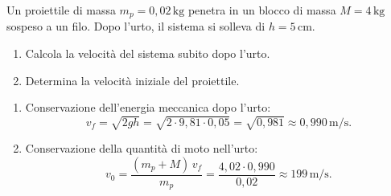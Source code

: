 
\begin{question}[ID=5.2, subtitle={Velocità del proiettile dal pendolo balistico}, tags={pendolo balistico, energia, urto anelastico}, difficulty=media]
Un proiettile di massa \(m_p = 0{,}02 \, \text{kg}\) penetra in un blocco di massa \(M = 4 \, \text{kg}\) sospeso a un filo. Dopo l'urto, il sistema si solleva di \(h = 5 \, \text{cm}\).
\begin{enumerate}
    \item Calcola la velocità del sistema subito dopo l'urto.
    \item Determina la velocità iniziale del proiettile.
\end{enumerate}
\begin{solution}
    \begin{enumerate}
        \item Conservazione dell'energia meccanica dopo l'urto:
        \[
            v_f = \sqrt{2gh} = \sqrt{2 \cdot 9{,}81 \cdot 0{,}05} = \sqrt{0{,}981} \approx 0{,}990 \, \text{m/s}.
        \]
        \item Conservazione della quantità di moto nell'urto:
        \[
            v_0 = \frac{(m_p + M)\,v_f}{m_p} = \frac{4{,}02 \cdot 0{,}990}{0{,}02} \approx 199 \, \text{m/s}.
        \]
    \end{enumerate}
\end{solution}
\end{question}


